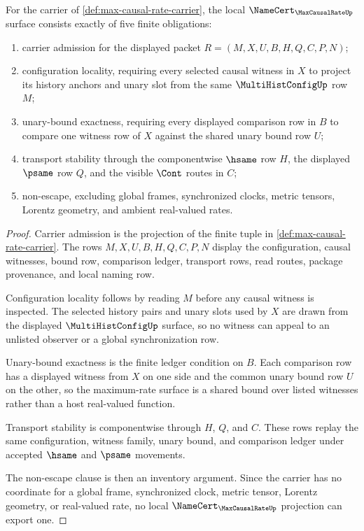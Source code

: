 \begin{theorem}
\label{thm:max-causal-rate-namecert-obligations}
For the carrier of \autoref{def:max-causal-rate-carrier}, the local $\NameCert_{\MaxCausalRateUp}$ surface consists exactly of five finite obligations:
\begin{enumerate}
\item carrier admission for the displayed packet $R=(M,X,U,B,H,Q,C,P,N)$;
\item configuration locality, requiring every selected causal witness in $X$ to project its history anchors and unary slot from the same $\MultiHistConfigUp$ row $M$;
\item unary-bound exactness, requiring every displayed comparison row in $B$ to compare one witness row of $X$ against the shared unary bound row $U$;
\item transport stability through the componentwise $\hsame$ row $H$, the displayed $\psame$ row $Q$, and the visible $\Cont$ routes in $C$;
\item non-escape, excluding global frames, synchronized clocks, metric tensors, Lorentz geometry, and ambient real-valued rates.
\end{enumerate}
\end{theorem}
\begin{proof}
Carrier admission is the projection of the finite tuple in \autoref{def:max-causal-rate-carrier}. The rows $M,X,U,B,H,Q,C,P,N$ display the configuration, causal witnesses, bound row, comparison ledger, transport rows, read routes, package provenance, and local naming row.

Configuration locality follows by reading $M$ before any causal witness is inspected. The selected history pairs and unary slots used by $X$ are drawn from the displayed $\MultiHistConfigUp$ surface, so no witness can appeal to an unlisted observer or a global synchronization row.

Unary-bound exactness is the finite ledger condition on $B$. Each comparison row has a displayed witness from $X$ on one side and the common unary bound row $U$ on the other, so the maximum-rate surface is a shared bound over listed witnesses rather than a host real-valued function.

Transport stability is componentwise through $H$, $Q$, and $C$. These rows replay the same configuration, witness family, unary bound, and comparison ledger under accepted $\hsame$ and $\psame$ movements.

The non-escape clause is then an inventory argument. Since the carrier has no coordinate for a global frame, synchronized clock, metric tensor, Lorentz geometry, or real-valued rate, no local $\NameCert_{\MaxCausalRateUp}$ projection can export one.
\end{proof}

